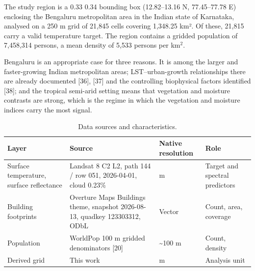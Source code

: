 \documentclass[conference]{IEEEtran}
\begin{document}
The study region is a 0.33\textdegree{} \texttimes{} 0.34\textdegree{} bounding box (12.82--13.16\textdegree{} N, 77.45--77.78\textdegree{} E) enclosing the
Bengaluru metropolitan area in the Indian state of Karnataka, analysed on a 250 m grid of 21,845
cells covering 1,348.25 km². Of these, 21,815 carry a valid temperature target. The region contains
a gridded population of 7,458,314 persons, a mean density of 5,533 persons per km\(^2\).

Bengaluru is an appropriate case for three reasons. It is among the larger and faster-growing Indian
metropolitan areas; LST--urban-growth relationships there are already documented {[}36{]}, {[}37{]} and the
controlling biophysical factors identified {[}38{]}; and the tropical semi-arid setting means that
vegetation and moisture contrasts are strong, which is the regime in which the vegetation and
moisture indices carry the most signal.

\begin{table}[!t]
\caption{Data sources and characteristics.}
\label{tab:1}
\centering
\footnotesize
\begin{tabular}{@{}
>{\raggedright\arraybackslash}p{}
  >{\raggedright\arraybackslash}p{}
  >{\raggedright\arraybackslash}p{}
  >{\raggedright\arraybackslash}p{}@{}}
\toprule\noalign{}
\begin{minipage}[b]{\linewidth}\raggedright
Layer
\end{minipage} & \begin{minipage}[b]{\linewidth}\raggedright
Source
\end{minipage} & \begin{minipage}[b]{\linewidth}\raggedright
Native resolution
\end{minipage} & \begin{minipage}[b]{\linewidth}\raggedright
Role
\end{minipage} \\
\midrule\noalign{}
Surface temperature, surface reflectance & Landsat 8 C2 L2, path 144 / row 051, 2026-04-01, cloud 0.23\% & 30 m & Target and spectral predictors \\
Building footprints & Overture Maps Buildings theme, snapshot 2026-08-13, quadkey 123303312, ODbL & Vector & Count, area, coverage \\
Population & WorldPop 100 m gridded denominators {[}20{]} & \textasciitilde100 m & Count, density \\
Derived grid & This work & 250 m & Analysis unit \\
\end{tabular}
\end{table}
\end{document}

